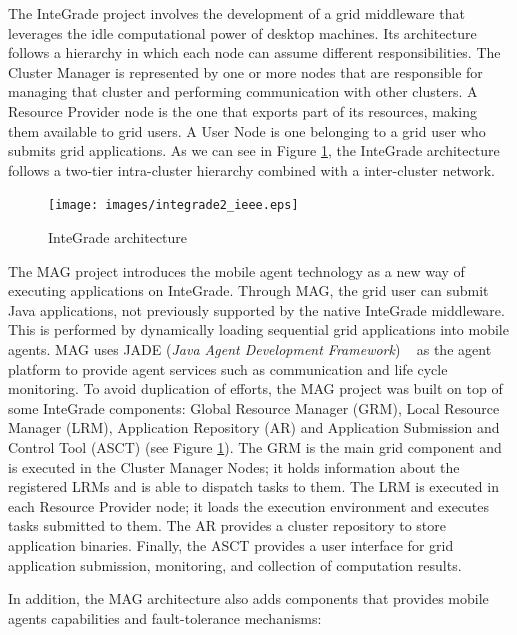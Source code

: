\documentclass[times, 09pt, twocolumn]{article}
\begin{document}
The InteGrade project involves the development of a grid middleware that
leverages the idle computational power of desktop machines. 
Its architecture follows a hierarchy in which each node can assume
different responsibilities. The Cluster Manager is represented by one or more
nodes that are responsible for managing that cluster and performing
communication with other clusters. A Resource Provider node is the one that
exports part of its resources, making them available to grid users. A User Node
is one belonging to a grid user who submits grid applications. As we can see in
Figure \ref{fig:integrade}, the InteGrade architecture follows a two-tier
intra-cluster hierarchy combined with a inter-cluster network.

\begin{figure}[th]
\centering \texttt{[image: images/integrade2\_ieee.eps]}
\caption{InteGrade architecture}
\label{fig:integrade}
\end{figure}

The MAG project \cite{lopes05} introduces the mobile agent technology as a new way
of executing applications on InteGrade. Through MAG, the grid user can submit
Java applications, not previously supported by the native InteGrade middleware. This is
performed by dynamically loading sequential grid applications into mobile
agents. MAG uses JADE (\emph{Java Agent Development Framework}) ~\cite{jade} as the agent
platform to provide agent services such as communication and life cycle
monitoring. 
To avoid duplication of efforts, the MAG project was built on top of
some InteGrade components: Global Resource Manager (GRM), Local Resource
Manager (LRM), Application Repository (AR) and Application Submission and
Control Tool (ASCT) (see Figure \ref{fig:integrade}). 
The GRM is the main grid component and is executed
in the Cluster Manager Nodes; it holds information about the registered
LRMs and is able to dispatch tasks to them. The LRM is executed in
each Resource Provider node; it loads the execution environment and
executes tasks submitted to them. The AR provides a cluster repository to
store application binaries. Finally, the ASCT provides a user interface for grid application submission,  
monitoring, and collection of computation results.

In addition, the MAG architecture also adds components that provides
mobile agents capabilities and fault-tolerance mechanisms:
\end{document}
